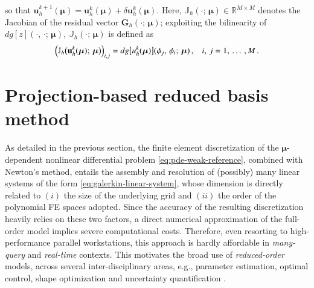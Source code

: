\documentclass{elsarticle}
\theoremstyle{theorem}
\theoremstyle{definition}
\theoremstyle{remark}
\theoremstyle{proposition}
\numberwithin{figure}{section}
\newcommand{\bg}[1]{\boldsymbol{#1}}
\begin{document}
		so that $\mathbf{u}^{k+1}_h(\bg{\mu}) = \mathbf{u}^k_h(\bg{\mu}) + \delta \mathbf{u}^k_h(\bg{\mu})$. Here, $\mathbb{J}_h(\cdot; \, \bg{\mu}) \in \mathbb{R}^{M \times M}$ denotes the Jacobian of the residual vector $\mathbf{G}_h(\cdot; \, \bg{\mu})$; exploiting the bilinearity of $dg[z](\cdot, \, \cdot; \, \bg{\mu})$, $\mathbb{J}_h(\cdot; \, \bg{\mu})$ is defined as
		\begin{equation*}
			\left( \mathbb{J}_h \big( \mathbf{u}^k_h(\bg{\mu}); \, \bg{\mu} \big) \right)_{i,j} = dg\big[u^k_h(\bg{\mu})\big](\phi_j, \, \phi_i; \, \bg{\mu}) \, , \hspace*{0.3cm} i, \, j = 1, \, \ldots \, , M \, .
		\end{equation*} 
		
		
	
	\section{Projection-based reduced basis method}
	\label{section:Projection-based reduced basis method}
	
		As detailed in the previous section, the finite element discretization of the $\bg{\mu}$-dependent nonlinear differential problem \eqref{eq:pde-weak-reference}, combined with Newton's method, entails the assembly and resolution of (possibly) many linear systems of the form \eqref{eq:galerkin-linear-system}, whose dimension is directly related to $(i)$ the size of the underlying grid and $(ii)$ the order of the polynomial FE spaces adopted. Since the accuracy of the resulting discretization heavily relies on these two factors, a direct numerical approximation of the full-order model implies severe computational costs. Therefore, even resorting to high-performance parallel workstations, this approach is hardly affordable in \emph{many-query} and \emph{real-time} contexts. %
		This motivates the broad use of \emph{reduced-order} models, across several inter-disciplinary areas, e.g., parameter estimation, optimal control, shape optimization and uncertainty quantification \cite{HSR16, QMN15}. 
		
\end{document}

